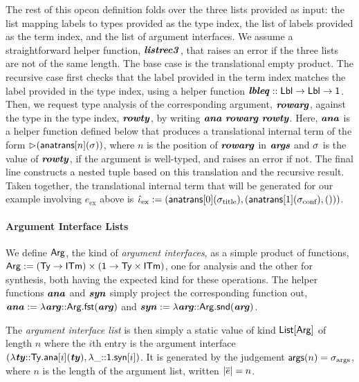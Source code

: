 \documentclass[10pt,preprint]{sigplanconf}
\begin{document}
The rest of this opcon definition folds over the three lists provided as input: the list mapping labels to types provided as the type index, the list of labels provided as the term index, and the list of argument interfaces. We assume a straightforward helper function, ${\textbf{\textit{listrec3}}}$, that raises an error if the three lists are not of the same length. The base case is the translational empty product. The recursive case first checks that the label provided in the term index matches the label provided in the type index, using a helper function ${\textbf{\textit{lbleq}}} :: {\sf Lbl} \rightarrow {\sf Lbl} \rightarrow {\sf 1}$. Then, we request type analysis of the corresponding argument, ${\textbf{\textit{rowarg}}}$,  against the type in the type index, ${\textbf{\textit{rowty}}}$, by writing ${\textbf{\textit{ana}}}~{\textbf{\textit{rowarg}}}~{\textbf{\textit{rowty}}}$. Here, ${\textbf{\textit{ana}}}$ is a helper function defined below that produces a translational internal term  of the form ${\rhd}({\sf anatrans}[n](\sigma))$, where $n$ is the position of ${\textbf{\textit{rowarg}}}$ in ${\textbf{\textit{args}}}$ and $\sigma$ is the value of ${\textbf{\textit{rowty}}}$, if the argument is well-typed, and raises an error if not. The final line constructs a nested tuple based on this translation and the recursive result. Taken together, the translational internal term that will be generated for our example involving $e_\text{ex}$ above is $\small\qitm_\text{ex} := (\anatrans{0}{\stx{title}}, (\anatrans{1}{\stx{conf}}, ()))$.

\paragraph{Argument Interface Lists} We define ${\sf Arg}$, the kind of \emph{argument interfaces}, as a simple product of functions, ${\sf Arg} := ({\sf Ty} \rightarrow {\sf ITm}) \times ({\sf 1} \rightarrow {\sf Ty}\times{\sf ITm})$, one for analysis and the other for synthesis, both having the expected kind for these operations. The helper functions ${\textbf{\textit{ana}}}$ and ${\textbf{\textit{syn}}}$ simply project the corresponding function out, ${\textbf{\textit{ana}}} := \lambda {\textbf{\textit{arg}}}{::}{\sf Arg}.{\sf fst}({\textbf{\textit{arg}}})$ and ${\textbf{\textit{syn}}}  :=  \lambda {\textbf{\textit{arg}}}{::}{\sf Arg}.{\sf snd}({\textbf{\textit{arg}}})$. 

The \emph{argument interface list} is then simply a static value of kind ${\sf List}[{\sf Arg}]$ of length $n$ where the $i$th entry is the argument interface $(\lambda {\textbf{\textit{ty}}}{::}{\sf Ty}.{\sf ana}[i]({\textbf{\textit{ty}}}), \lambda \_{::}{\sf 1}.{\sf syn}[i])$. It is generated by the judgement ${\sf args}(n)=\sigma_\text{args}$, where $n$ is the length of the argument list, written $|\overline{e}|=n$.
\end{document}
